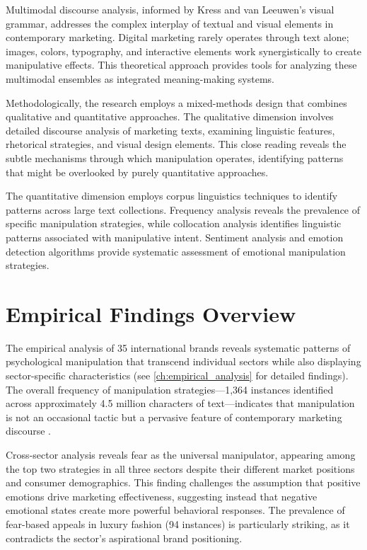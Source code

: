 Multimodal discourse analysis, informed by Kress and van Leeuwen's visual grammar, addresses the complex interplay of textual and visual elements in contemporary marketing. Digital marketing rarely operates through text alone; images, colors, typography, and interactive elements work synergistically to create manipulative effects. This theoretical approach provides tools for analyzing these multimodal ensembles as integrated meaning-making systems.

Methodologically, the research employs a mixed-methods design that combines qualitative and quantitative approaches. The qualitative dimension involves detailed discourse analysis of marketing texts, examining linguistic features, rhetorical strategies, and visual design elements. This close reading reveals the subtle mechanisms through which manipulation operates, identifying patterns that might be overlooked by purely quantitative approaches.

The quantitative dimension employs corpus linguistics techniques to identify patterns across large text collections. Frequency analysis reveals the prevalence of specific manipulation strategies, while collocation analysis identifies linguistic patterns associated with manipulative intent. Sentiment analysis and emotion detection algorithms provide systematic assessment of emotional manipulation strategies.

\section{Empirical Findings Overview}
\label{sec:findings_overview}

The empirical analysis of 35 international brands reveals systematic patterns of psychological manipulation that transcend individual sectors while also displaying sector-specific characteristics (see \autoref{ch:empirical_analysis} for detailed findings). The overall frequency of manipulation strategies—1,364 instances identified across approximately 4.5 million characters of text—indicates that manipulation is not an occasional tactic but a pervasive feature of contemporary marketing discourse \cite{fairclough2015language}.

Cross-sector analysis reveals fear as the universal manipulator, appearing among the top two strategies in all three sectors despite their different market positions and consumer demographics. This finding challenges the assumption that positive emotions drive marketing effectiveness, suggesting instead that negative emotional states create more powerful behavioral responses. The prevalence of fear-based appeals in luxury fashion (94 instances) is particularly striking, as it contradicts the sector's aspirational brand positioning.


